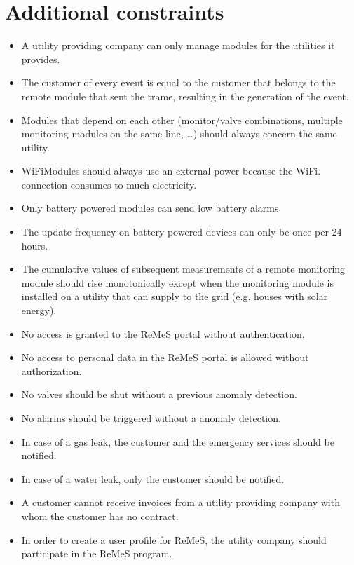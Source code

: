 \chapter{Additional constraints}
\label{additional-constraints}

\begin{itemize}
	\item A utility providing company can only manage modules for the utilities it
	provides.
	\item The customer of every event is equal to the customer that belongs to the
	remote module that sent the trame, resulting in the generation of the event.
	\item Modules that depend on each other (monitor/valve combinations, multiple
	monitoring modules on the same line, \ldots) should always concern the same
	utility.
	\item WiFiModules should always use an external power because the WiFi.
	connection consumes to much electricity.
	\item Only battery powered modules can send low battery alarms.
	\item The update frequency on battery powered devices can only be once per 24 hours. 
	\item The cumulative values of subsequent measurements of a remote
	monitoring module should rise monotonically except when the monitoring module
	is installed on a utility that can supply to the grid (e.g. houses with solar
	energy).
	\item No access is granted to the ReMeS portal without authentication.
	\item No access to personal data in the ReMeS portal is allowed without
	authorization.
	\item No valves should be shut without a previous anomaly detection.
	\item No alarms should be triggered without a anomaly detection.
	\item In case of a gas leak, the customer and the emergency services should be
	notified.
	\item In case of a water leak, only the customer should be notified.
	\item A customer cannot receive invoices from a utility providing company with
	whom the customer has no contract.
	\item In order to create a user profile for ReMeS, the utility company should
	participate in the ReMeS program.
\end{itemize}